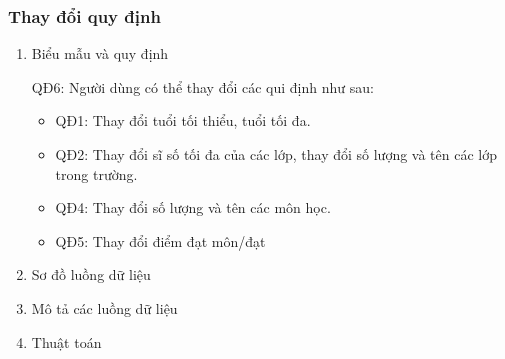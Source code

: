 \documentclass[a4paper]{article}
\begin{document}
			\subsubsection{Thay đổi quy định}
			\begin{enumerate}[label=\alph*.]
\item Biểu mẫu và quy định

QĐ6: Người dùng có thể thay đổi các qui định như sau: 
\begin{itemize}
 \item QĐ1: Thay đổi tuổi tối thiểu, tuổi tối đa.
      \item QĐ2: Thay đổi sĩ số tối đa của các lớp, thay đổi số lượng và tên các lớp trong trường.
      \item QĐ4: Thay đổi số lượng và tên các môn học.
      \item QĐ5: Thay đổi điểm đạt môn/đạt
\end{itemize}


\item Sơ đồ luồng dữ liệu
\item Mô tả các luồng dữ liệu
\item Thuật toán
\end{enumerate}	
		
\end{document}
